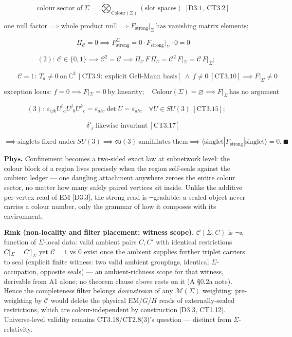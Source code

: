\begin{theorem}
\[
\qquad \text{colour sector of}\ \Sigma\ =\bigotimes_{\mathrm{Colour}(\Sigma)}(\text{slot spaces})\ [\mathrm{D3.1},\ \mathrm{CT3.2}]
\]

\[
\text{one null factor}\implies\text{whole product null}\implies F_{\mathrm{strong}}|_\Sigma\ \text{has vanishing matrix elements};
\]

\[
\qquad \Pi_{\mathcal C}=0\implies F^\Sigma_{\mathrm{strong}}=0\cdot F_{\mathrm{strong}}|_\Sigma\cdot0=0
\]

\[
(2):\ \mathcal C\in\{0,1\}\implies\mathcal C^2=\mathcal C\implies\Pi_{\mathcal C}\,F\,\Pi_{\mathcal C}=\mathcal C^2\,F|_\Sigma=\mathcal C\,F|_\Sigma;
\]

\[
\qquad \mathcal C=1:\ T_a\ne0\ \text{on}\ \mathbb C^3\ [\mathrm{CT3.9}:\ \text{explicit Gell-Mann basis}]\ \wedge\ f\ne0\ [\mathrm{CT3.10}]\implies F|_\Sigma\ne0
\]

\[
\text{exception locus}:\ f=0\implies F|_\Sigma=0\ \text{by linearity};\quad \mathrm{Colour}(\Sigma)=\varnothing\implies F|_\Sigma\ \text{has no argument}
\]

\[
(3):\ \varepsilon_{ijk}U^i{}_aU^j{}_bU^k{}_c=\varepsilon_{abc}\det U=\varepsilon_{abc}\quad\forall U\in SU(3)\ [\mathrm{CT3.15}];
\]

\[
\qquad \delta^i{}_j\ \text{likewise invariant}\ [\mathrm{CT3.17}]
\]

\[
\implies\text{singlets fixed under}\ SU(3)\implies\mathfrak{su}(3)\ \text{annihilates them}\implies\langle\text{singlet}|F_{\mathrm{strong}}|\text{singlet}\rangle=0.\ \blacksquare
\]

\textbf{Phys.} Confinement becomes a two-sided exact law at subnetwork level: the colour block of a region lives precisely when the region self-seals against the ambient ledger — one dangling attachment anywhere zeroes the entire colour sector, no matter how many safely paired vertices sit inside. Unlike the additive per-vertex read of EM [D3.3], the strong read is $\neg$gradable: a sealed object never carries a colour number, only the grammar of how it composes with its environment.

\textbf{Rmk (non-locality and filter placement; witness scope).} $\mathcal C(\Sigma;C)$ is $\neg$a function of $\Sigma$-local data: valid ambient pairs $C,C'$ with identical restrictions $C|_\Sigma=C'|_\Sigma$ yet $\mathcal C=1$ vs $0$ exist once the ambient supplies further triplet carriers to seal (explicit finite witness: two valid ambient groupings, identical $\Sigma$-occupation, opposite seals) — an ambient-richness scope for that witness, $\neg$derivable from A1 alone; no theorem clause above rests on it (A §0.2a note). Hence the completeness filter belongs \textit{downstream} of any $\mathcal M(\Sigma)$ weighting: pre-weighting by $\mathcal C$ would delete the physical EM/$G$/$H$ reads of externally-sealed restrictions, which are colour-independent by construction [D3.3, CT1.12]. Universe-level validity remains CT3.18/CT2.8(3)'s question — distinct from $\Sigma$-relativity.

\end{theorem}

